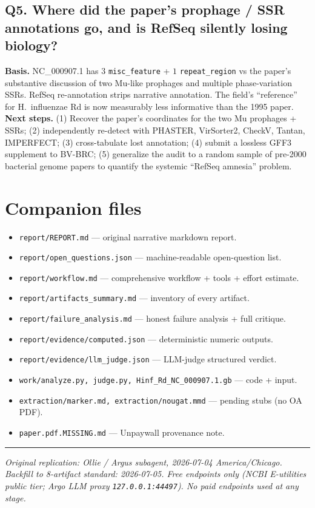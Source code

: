 \documentclass[10pt]{article}
\begin{document}
\subsection*{Q5. Where did the paper's prophage / SSR annotations go, and is RefSeq silently losing biology?}
\textbf{Basis.} NC\_000907.1 has $3$ \texttt{misc\_feature} + $1$ \texttt{repeat\_region} vs
the paper's substantive discussion of two Mu-like prophages and multiple phase-variation
SSRs. RefSeq re-annotation strips narrative annotation. The field's ``reference'' for
H.\ influenzae Rd is now measurably less informative than the 1995 paper.
\textbf{Next steps.} (1) Recover the paper's coordinates for the two Mu prophages + SSRs;
(2) independently re-detect with PHASTER, VirSorter2, CheckV, Tantan, IMPERFECT;
(3) cross-tabulate lost annotation; (4) submit a lossless GFF3 supplement to BV-BRC;
(5) generalize the audit to a random sample of pre-2000 bacterial genome papers to
quantify the systemic ``RefSeq amnesia'' problem.

\section*{Companion files}
\begin{itemize}[leftmargin=1.2em]
\item \texttt{report/REPORT.md} --- original narrative markdown report.
\item \texttt{report/open\_questions.json} --- machine-readable open-question list.
\item \texttt{report/workflow.md} --- comprehensive workflow + tools + effort estimate.
\item \texttt{report/artifacts\_summary.md} --- inventory of every artifact.
\item \texttt{report/failure\_analysis.md} --- honest failure analysis + full critique.
\item \texttt{report/evidence/computed.json} --- deterministic numeric outputs.
\item \texttt{report/evidence/llm\_judge.json} --- LLM-judge structured verdict.
\item \texttt{work/analyze.py, judge.py, Hinf\_Rd\_NC\_000907.1.gb} --- code + input.
\item \texttt{extraction/marker.md, extraction/nougat.mmd} --- pending stubs (no OA PDF).
\item \texttt{paper.pdf.MISSING.md} --- Unpaywall provenance note.
\end{itemize}

\vspace{1em}
\hrule
\vspace{0.5em}
\noindent\small\emph{Original replication: Ollie / Argus subagent, 2026-07-04 America/Chicago.
Backfill to 8-artifact standard: 2026-07-05. Free endpoints only (NCBI E-utilities public tier;
Argo LLM proxy \texttt{127.0.0.1:44497}). No paid endpoints used at any stage.}
\end{document}
